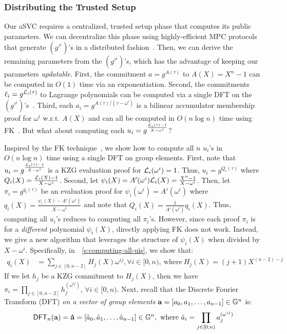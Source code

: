 \subsubsection{Distributing the Trusted Setup}
\label{s:asvc:from-kzg:public-params}
Our aSVC requires a centralized, trusted setup phase that computes its public parameters.
We can decentralize this phase using highly-efficient MPC protocols that generate $(g^{\tau^i})$'s in a distributed fashion~\cite{BGM17}.
Then, we can derive the remaining parameters from the $(g^{\tau^i})$'s, which has the advantage of keeping our parameters \textit{updatable}.
First, the commitment $a=g^{A(\tau)}$ to $A(X)=X^{n} - 1$ can be computed in $O(1)$ time via an exponentiation.
Second, the commitments $\ell_i=g^{\mathcal{L}_i(\tau)}$ to Lagrange polynomials can be computed via a single DFT on the $(g^{\tau^i})$'s~\cite[Sec 3.12.3, pg. 97]{Virza17}.
Third, each $a_i = g^{A(\tau)/(\tau -\omega^i)}$ is a bilinear accumulator membership proof for $\omega^i$ w.r.t. $A(X)$ and can all be computed in $O(n\log{n})$ time using FK~\cite{FK20}.
But what about computing each $u_i =  g^{\frac{\mathcal{L}_i(\tau)-1}{X-\omega^i}}$?

Inspired by the FK technique~\cite{FK20}, we show how to compute all $n$ $u_i$'s in $O(n\log{n})$ time using a single DFT on group elements.
First, note that $u_i=g^{\frac{\mathcal{L}_i(\tau)-1}{X-\omega^i}}$ is a KZG evaluation proof for $\mathcal{L}_i(\omega^i)=1$.
Thus, $u_i = g^{Q_i(\tau)}$ where $Q_i(X) = \frac{\mathcal{L}_i(X)-1}{X-\omega^i}$.
Second, let $\psi_i(X)=A'(\omega^i)\mathcal{L}_i(X)=\frac{X^n - 1}{X-\omega^i}$.
Then, let $\pi_i=g^{q_i(\tau)}$ be an evaluation proof for $\psi_i(\omega^i)=A'(\omega^i)$ where $q_i(X) = \frac{\psi_i(X)-A'(\omega^i)}{X-\omega^i}$ and note that $Q_i(X)=\frac{1}{A'(\omega^i)}q_i(X)$. %
Thus,  computing all $u_i$'s reduces to computing all $\pi_i$'s.
However, since each proof $\pi_i$ is for a \textit{different} polynomial $\psi_i(X)$, directly applying FK does not work.
Instead, we give a new algorithm that leverages the structure of $\psi_i(X)$ when divided by $X-\omega^i$.
Specifically, in\ifCameraReady~\cite[Appendix B]{TAB+20e}\else~\cref{s:computing-all-uis}\fi, we show that:
\begin{align}
\label{eq:ui-qi}
q_i(X) &= \sum_{j\in [0,n-2]} H_j(X) \omega^{ij},\forall i \in [0,n),\ \text{where}\ H_j(X) = (j+1) X^{(n-2)-j}
\end{align}
If we let $h_j$ be a KZG commitment to $H_j(X)$, then we have $\pi_i = \prod_{j\in [0,n-2]} h_j^{(\omega^{ij})}$, $\forall i \in [0,n)$.
Next, recall that the Discrete Fourier Transform (DFT) \textit{on a vector of group elements} $\bm{\mathrm{a}}=[a_0, a_1, \dots, a_{n-1}]\in \mathbb{G}^n$ is:
\begin{align}
\mathsf{DFT}_n(\bm{\mathrm{a}}) = \bm{\mathrm{\hat{a}}}=[\hat{a}_0, \hat{a}_1, \dots, \hat{a}_{n-1}]\in \mathbb{G}^n,\ \text{where}\ \hat{a}_i= \prod_{j\in [0,n)} a_j^{(\omega^{ij})}
\end{align}


